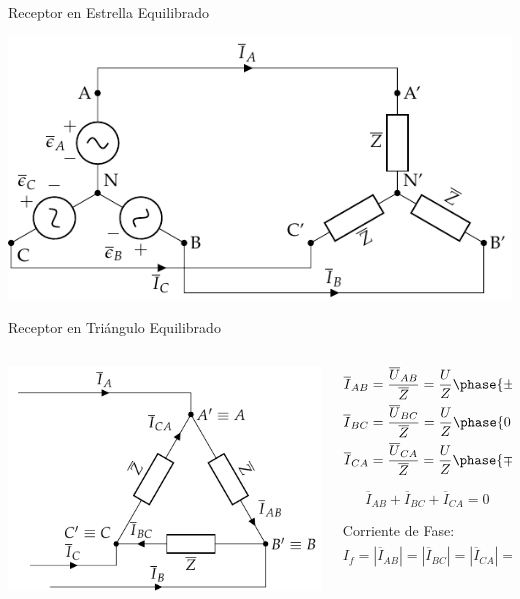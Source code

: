\documentclass[aspectratio=169, usenames,svgnames,dvipsnames]{beamer}
\begin{document}
\begin{frame}[label={sec:org4a88d44}]{Receptor en Estrella Equilibrado}
\begin{center}
\includegraphics[width=.9\linewidth]{../figs/EstrellaEquilibrado_SinNeutro.pdf}
\end{center}
\end{frame}

\begin{frame}[label={sec:org4ba7009}]{Receptor en Triángulo Equilibrado}
\begin{columns}
\begin{column}{0.5\columnwidth}
\begin{center}
\includegraphics[width=.9\linewidth]{../figs/TrianguloEquilibrado_Receptor.pdf}
\end{center}
\end{column}

\begin{column}{0.5\columnwidth}
\begin{align*}
  \overline{I}_{AB} &= \frac{\overline{U}_{AB}}{\overline{Z}} = \frac{U}{Z}\phase{\ang{\pm 120} - \theta} \\
  \overline{I}_{BC} &= \frac{\overline{U}_{BC}}{\overline{Z}} = \frac{U}{Z}\phase{0 - \theta}\\
  \overline{I}_{CA} &= \frac{\overline{U}_{CA}}{\overline{Z}} = \frac{U}{Z}\phase{\ang{\mp 120} - \theta}
\end{align*}

\[
   \overline{I}_{AB}  + \overline{I}_{BC} + \overline{I}_{CA}  = 0 
\]

Corriente de Fase:
\[
  \boxed{I_f = |\overline{I}_{AB}| = |\overline{I}_{BC}| = |\overline{I}_{CA}| = \frac{U}{Z}}
\]
\end{column}
\end{columns}
\end{frame}
\end{document}
